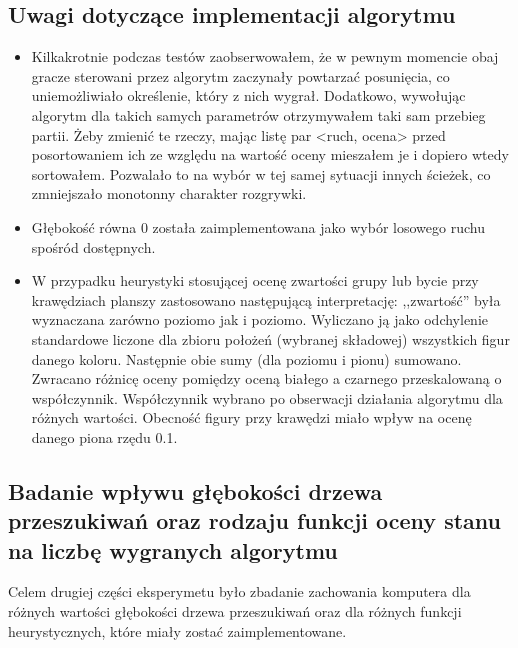 \subsection{Uwagi dotyczące implementacji algorytmu}
\begin{itemize}
    \item Kilkakrotnie podczas testów zaobserwowałem, że w pewnym momencie obaj gracze
    sterowani przez algorytm zaczynały powtarzać posunięcia, co uniemożliwiało
    określenie, który z nich wygrał. Dodatkowo, wywołując algorytm dla takich
    samych parametrów otrzymywałem taki sam przebieg partii. Żeby zmienić te
    rzeczy, mając listę par <ruch, ocena> przed posortowaniem ich ze względu na
    wartość oceny mieszałem je i dopiero wtedy sortowałem. Pozwalało to na wybór
    w tej samej sytuacji innych ścieżek, co zmniejszało monotonny charakter
    rozgrywki.

    \item Głębokość równa 0 została zaimplementowana jako wybór losowego ruchu spośród
dostępnych.

    \item W przypadku heurystyki stosującej ocenę zwartości grupy lub bycie przy
    krawędziach planszy zastosowano następującą interpretację: ,,zwartość'' była
    wyznaczana zarówno poziomo jak i poziomo. Wyliczano ją jako odchylenie
    standardowe liczone dla zbioru położeń (wybranej składowej) wszystkich figur
    danego koloru. Następnie obie sumy (dla poziomu i pionu) sumowano. Zwracano
    różnicę oceny pomiędzy oceną białego a czarnego przeskalowaną o współczynnik.
    Współczynnik wybrano po obserwacji działania algorytmu dla różnych wartości.
    Obecność figury przy krawędzi miało wpływ na ocenę danego piona rzędu 0.1.
\end{itemize}
\subsection{Badanie wpływu głębokości drzewa przeszukiwań oraz rodzaju funkcji
oceny stanu na liczbę wygranych algorytmu}

Celem drugiej części eksperymetu było zbadanie zachowania komputera dla różnych
wartości głębokości drzewa przeszukiwań oraz dla różnych funkcji
heurystycznych, które miały zostać zaimplementowane. 

